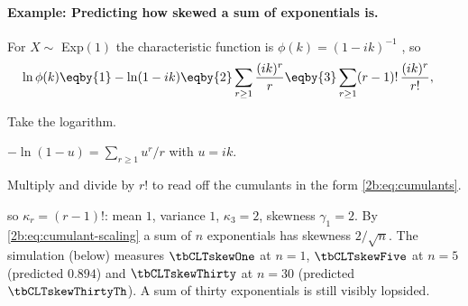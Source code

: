 \paragraph{Example: Predicting how skewed a sum of exponentials is.}
\label{2b:ex:skew}
For $X\sim$ Exp$(1)$ the characteristic function is $\phi(k)=(1-ik)^{-1}$ , so
\begin{align*}
  \ln\phi(k)
  &\eqby{1} -\ln(1-ik)
  \eqby{2} \sum_{r\ge1}\frac{(ik)^r}{r}
  \eqby{3} \sum_{r\ge1}(r-1)!\,\frac{(ik)^r}{r!} ,
\end{align*}
\begin{explain}
  \item Take the logarithm.
  \item $-\ln(1-u)=\sum_{r\ge1}u^r/r$ with $u=ik$.
  \item Multiply and divide by $r!$ to read off the cumulants in the form \eqref{2b:eq:cumulants}.
\end{explain}
so $\kappa_r=(r-1)!$: mean $1$, variance $1$, $\kappa_3=2$, skewness $\gamma_1=2$. By \eqref{2b:eq:cumulant-scaling} a sum of $n$ exponentials has skewness $2/\sqrt n$. The simulation (below) measures $\tbCLTskewOne$ at $n=1$, $\tbCLTskewFive$ at $n=5$ (predicted $0.894$) and $\tbCLTskewThirty$ at $n=30$ (predicted $\tbCLTskewThirtyTh$). A sum of thirty exponentials is still visibly lopsided.

